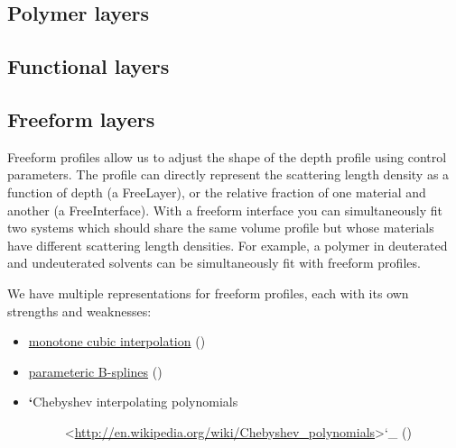 \documentclass[letterpaper,10pt,english]{sphinxmanual}
\begin{document}
\subsection{Polymer layers}
\label{guide/sample:polymer-layers}

\subsection{Functional layers}
\label{guide/sample:functional-layers}

\subsection{Freeform layers}
\label{guide/sample:freeform-layers}
Freeform profiles allow us to adjust the shape of the depth profile using
control parameters.  The profile can directly represent the scattering
length density as a function of depth (a FreeLayer), or the relative
fraction of one material and another (a FreeInterface).  With a freeform
interface you can simultaneously fit two systems which should share the
same volume profile but whose materials have different scattering length
densities.  For example, a polymer in deuterated and undeuterated solvents
can be simultaneously fit with freeform profiles.

We have multiple representations for freeform profiles, each with its
own strengths and weaknesses:
\begin{itemize}
\item {} 
\href{http://en.wikipedia.org/wiki/Monotone\_cubic\_interpolation}{monotone cubic interpolation}
({\hyperref[api/mono:module-refl1d.mono]{}})

\item {} 
\href{http://en.wikipedia.org/wiki/B-spline}{parameteric B-splines}
({\hyperref[api/freeform:module-refl1d.freeform]{}})

\item {} \begin{description}
\item[{{\color{red}\bfseries{}{}`}Chebyshev interpolating polynomials}] \leavevmode
\textless{}\href{http://en.wikipedia.org/wiki/Chebyshev\_polynomials}{http://en.wikipedia.org/wiki/Chebyshev\_polynomials}\textgreater{}{}`\_
({\hyperref[api/cheby:module-refl1d.cheby]{}})

\end{description}

\end{itemize}
\end{document}
